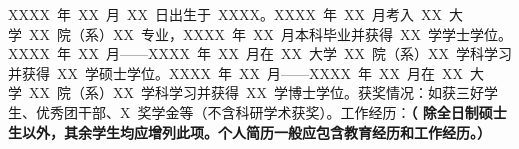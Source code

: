﻿%

\begin{resume}
XXXX~年~XX~月~XX~日出生于~XXXX。XXXX~年~XX~月考入~XX~大学~XX~院（系）XX~专业，XXXX~年~XX~月本科毕业并获得~XX~学学士学位。XXXX~年~XX~月------XXXX~年~XX~月在~XX~大学~XX~院（系）XX~学科学习并获得~XX~学硕士学位。XXXX~年~XX~月------XXXX~年~XX~月在~XX~大学~XX~院（系）XX~学科学习并获得~XX~学博士学位。获奖情况：如获三好学生、优秀团干部、X~奖学金等（不含科研学术获奖）。工作经历：\textbf{（ 除全日制硕士生以外，其余学生均应增列此项。个人简历一般应包含教育经历和工作经历。）}
\end{resume}
